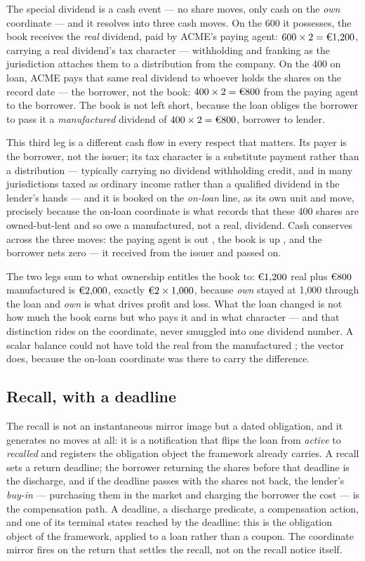 The special dividend is a cash event --- no share moves, only cash on the \emph{own}
coordinate --- and it resolves into three cash moves. On the 600 it possesses, the book
receives the \emph{real} dividend, paid by ACME's paying agent:
$600 \times 2 = \EUR{1{,}200}$, carrying a real dividend's tax character --- withholding
and franking as the jurisdiction attaches them to a distribution from the company. On the
400 on loan, ACME pays that same real dividend to whoever holds the shares on the record
date --- the borrower, not the book: $400 \times 2 = \EUR{800}$ from the paying agent to
the borrower. The book is not left short, because the loan obliges the borrower to pass
it a \emph{manufactured} dividend of $400 \times 2 = \EUR{800}$, borrower to lender.

This third leg is a different cash flow in every respect that matters. Its payer is the
borrower, not the issuer; its tax character is a substitute payment rather than a
distribution --- typically carrying no dividend withholding credit, and in many
jurisdictions taxed as ordinary income rather than a qualified dividend in the lender's
hands --- and it is booked on the \emph{on-loan} line, as its own unit and move, precisely
because the on-loan coordinate is what records that these 400 shares are owned-but-lent
and so owe a manufactured, not a real, dividend. Cash conserves across the three moves:
the paying agent is out , the book is up , and the borrower
nets zero --- it received  from the issuer and passed  on.

The two legs sum to what ownership entitles the book to: $\EUR{1{,}200}$ real plus
$\EUR{800}$ manufactured is $\EUR{2{,}000}$, exactly $\EUR{2} \times 1{,}000$, because
\emph{own} stayed at 1{,}000 through the loan and \emph{own} is what drives profit and
loss. What the loan changed is not how much the book earns but who pays it and in what
character --- and that distinction rides on the coordinate, never smuggled into one
dividend number. A scalar balance could not have told the real  from the
manufactured ; the vector does, because the on-loan coordinate was there to
carry the difference.

\subsection{Recall, with a deadline}

The recall is not an instantaneous mirror image but a dated obligation, and it generates
no moves at all: it is a notification that flips the loan from \emph{active} to
\emph{recalled} and registers the obligation object the framework already carries. A
recall sets a return deadline; the borrower returning the shares before that deadline is
the discharge, and if the deadline passes with the shares not back, the lender's
\emph{buy-in} --- purchasing them in the market and charging the borrower the cost --- is
the compensation path. A deadline, a discharge predicate, a compensation action, and one
of its terminal states reached by the deadline: this is the obligation object of the
framework, applied to a loan rather than a coupon. The coordinate mirror fires on the
return that settles the recall, not on the recall notice itself.

